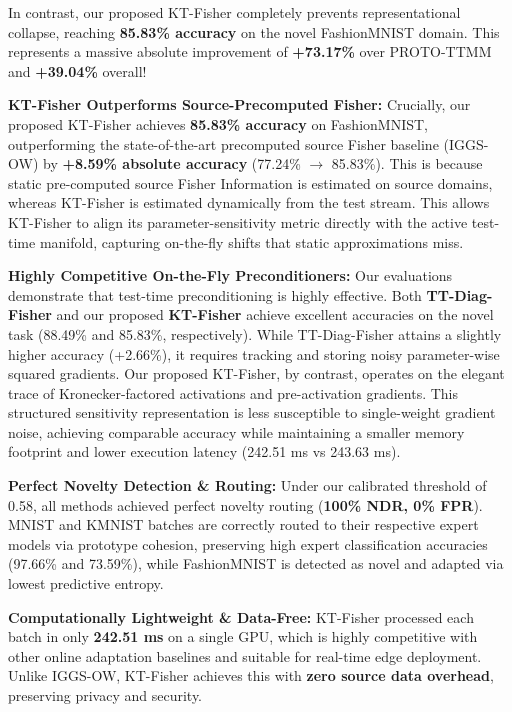 \documentclass{article}
\theoremstyle{plain}
\theoremstyle{definition}
\theoremstyle{remark}
\begin{document}
In contrast, our proposed KT-Fisher completely prevents representational collapse, reaching \textbf{85.83\% accuracy} on the novel FashionMNIST domain. This represents a massive absolute improvement of \textbf{+73.17\%} over PROTO-TTMM and \textbf{+39.04\%} overall!

\textbf{KT-Fisher Outperforms Source-Precomputed Fisher:}
Crucially, our proposed KT-Fisher achieves \textbf{85.83\% accuracy} on FashionMNIST, outperforming the state-of-the-art precomputed source Fisher baseline (IGGS-OW) by \textbf{+8.59\% absolute accuracy} (77.24\% $\rightarrow$ 85.83\%). This is because static pre-computed source Fisher Information is estimated on source domains, whereas KT-Fisher is estimated dynamically from the test stream. This allows KT-Fisher to align its parameter-sensitivity metric directly with the active test-time manifold, capturing on-the-fly shifts that static approximations miss.

\textbf{Highly Competitive On-the-Fly Preconditioners:}
Our evaluations demonstrate that test-time preconditioning is highly effective. Both \textbf{TT-Diag-Fisher} and our proposed \textbf{KT-Fisher} achieve excellent accuracies on the novel task (88.49\% and 85.83\%, respectively). While TT-Diag-Fisher attains a slightly higher accuracy (+2.66\%), it requires tracking and storing noisy parameter-wise squared gradients. Our proposed KT-Fisher, by contrast, operates on the elegant trace of Kronecker-factored activations and pre-activation gradients. This structured sensitivity representation is less susceptible to single-weight gradient noise, achieving comparable accuracy while maintaining a smaller memory footprint and lower execution latency (242.51 ms vs 243.63 ms).

\textbf{Perfect Novelty Detection \& Routing:}
Under our calibrated threshold of 0.58, all methods achieved perfect novelty routing (\textbf{100\% NDR, 0\% FPR}). MNIST and KMNIST batches are correctly routed to their respective expert models via prototype cohesion, preserving high expert classification accuracies (97.66\% and 73.59\%), while FashionMNIST is detected as novel and adapted via lowest predictive entropy.

\textbf{Computationally Lightweight \& Data-Free:}
KT-Fisher processed each batch in only \textbf{242.51 ms} on a single GPU, which is highly competitive with other online adaptation baselines and suitable for real-time edge deployment. Unlike IGGS-OW, KT-Fisher achieves this with \textbf{zero source data overhead}, preserving privacy and security.
\end{document}
